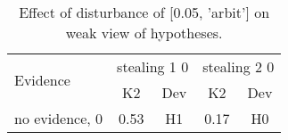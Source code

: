 \begin{table}\begin{tabular}{l|cc|cc}\toprule\multirow{2}{*}{Evidence} & \multicolumn{2}{c}{stealing 1 0}& \multicolumn{2}{c}{stealing 2 0}\\& {K2} & {Dev}& {K2} & {Dev}\\\midrule
no evidence, 0 & \cellcolor{Bittersweet}0.53&\cellcolor{Bittersweet}H1&\cellcolor{Bittersweet}0.17&\cellcolor{Bittersweet}H0\\\bottomrule\end{tabular}\caption{Effect of disturbance of [0.05, 'arbit'] on weak view of hypotheses.}\end{table}